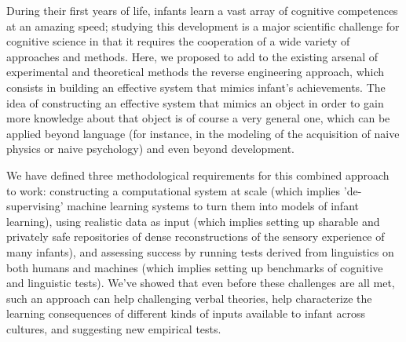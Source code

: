 \documentclass[jou,apacite]{apa6}
\begin{document}
During their first years of life, infants learn a vast array of cognitive competences at an amazing speed; studying this development is a major scientific challenge for cognitive science in that it requires the cooperation of a wide variety of approaches and methods. Here, we proposed to add to the existing arsenal of experimental and theoretical methods the reverse engineering approach, which consists in building an effective system that mimics infant's achievements. The idea of constructing an effective system that mimics an object in order to gain more knowledge about that object is of course a very general one, which can be applied beyond language (for instance, in the modeling of the acquisition of naive physics or naive psychology) and even beyond development. %










We have defined three methodological requirements for this combined approach to work: constructing a computational system at scale (which implies 'de-supervising' machine learning systems to turn them into models of infant learning), using realistic data as input (which implies setting up sharable and privately safe repositories of dense reconstructions of the sensory experience of many infants), and assessing success by running tests derived from linguistics on both humans and machines (which implies setting up benchmarks of cognitive and linguistic tests). We've showed that even before these challenges are all met, such an approach can help challenging verbal theories, help characterize the learning consequences of different kinds of  inputs available to infant across cultures, and suggesting new empirical tests.
\end{document}
